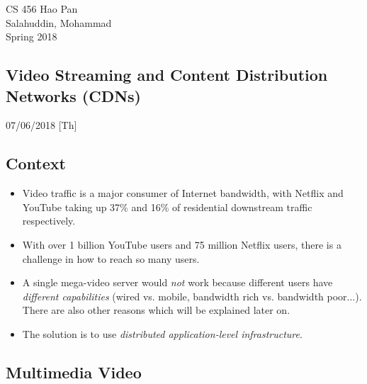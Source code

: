 \documentclass{article}
\begin{document}
\noindent
{CS 456 \hfill Hao Pan}\\
{Salahuddin, Mohammad}\\
{Spring 2018}


\begin{center}
\section{Video Streaming and Content Distribution Networks (CDNs)}
\noindent
{\hfill 07/06/2018 [Th]}
\end{center}

\subsection{Context}

\begin{itemize}
\item Video traffic is a major consumer of Internet bandwidth, with Netflix and YouTube taking up 37\% and 16\% of residential downstream traffic respectively.
\item With over 1 billion YouTube users and 75 million Netflix users, there is a challenge in how to reach so many users.
\item A single mega-video server would \emph{not} work because different users have \emph{different capabilities} (wired vs. mobile, bandwidth rich vs. bandwidth poor...). There are also other reasons which will be explained later on.
\item The solution is to use \emph{distributed application-level infrastructure}.
\end{itemize}

\subsection{Multimedia Video}
\end{document}
